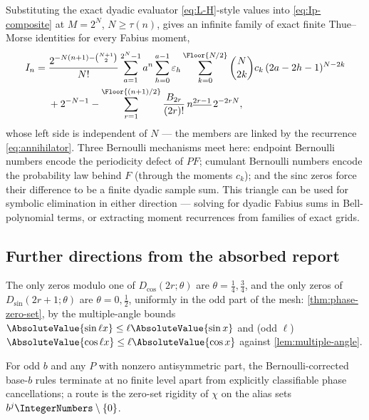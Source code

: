 \documentclass[11pt,oneside]{article}
\numberwithin{equation}{section}
\theoremstyle{definition}
\theoremstyle{remark}
\newcommand{\eps}{\varepsilon}
\newcommand{\fall}[2]{#1^{\underline{#2}}}
\begin{document}
Substituting the exact dyadic evaluator \eqref{eq:L-H}-style values
into \eqref{eq:Ip-composite} at $M=2^{N}$, $N\ge\tau(n)$, gives an
infinite family of exact finite Thue--Morse identities for every
Fabius moment,
\begin{align}
 I_n
 ={}&\frac{2^{-N(n+1)-\binom{N+1}2}}{N!}
 \sum_{a=1}^{2^{N}-1}a^{n}
 \sum_{h=0}^{a-1}\eps_h
 \sum_{k=0}^{\Floor{N/2}}\binom N{2k}c_k\,(2a-2h-1)^{N-2k}
 \notag\\
 &+2^{-N-1}
 -\sum_{r=1}^{\Floor{(n+1)/2}}
 \frac{B_{2r}}{(2r)!}\,\fall n{2r-1}\,2^{-2rN},
 \label{eq:In-TM-family}
\end{align}
whose left side is independent of $N$ --- the members are linked by the
recurrence \eqref{eq:annihilator}.  Three Bernoulli mechanisms meet
here: endpoint Bernoulli numbers encode the periodicity defect of
$PF$; cumulant Bernoulli numbers encode the probability law behind $F$
(through the moments $c_k$); and the sinc zeros force their difference
to be a finite dyadic sample sum.  This triangle can be used for
symbolic elimination in either direction --- solving for dyadic Fabius
sums in Bell-polynomial terms, or extracting moment recurrences from
families of exact grids.

\subsection{Further directions from the absorbed report}

\begin{remark}
\label{conj:F-phase-zeros}
The only zeros modulo one of $D_{\cos}(2r;\theta)$ are
$\theta=\tfrac14,\tfrac34$, and the only zeros of
$D_{\sin}(2r+1;\theta)$ are $\theta=0,\tfrac12$, uniformly in the
odd part of the mesh: \cref{thm:phase-zero-set}, by the multiple-angle
bounds $\AbsoluteValue{\sin\ell x}\le\ell\AbsoluteValue{\sin x}$ and (odd $\ell$)
$\AbsoluteValue{\cos\ell x}\le\ell\AbsoluteValue{\cos x}$ against
\cref{lem:multiple-angle}.
\end{remark}

\begin{conjecture}
\label{conj:odd-base}
For odd $b$ and any $P$ with nonzero antisymmetric part, the
Bernoulli-corrected base-$b$ rules terminate at no finite level apart
from explicitly classifiable phase cancellations; a route is the
zero-set rigidity of $\chi$ on the alias sets
$b^{j}\IntegerNumbers\setminus\{0\}$.
\end{conjecture}
\end{document}
